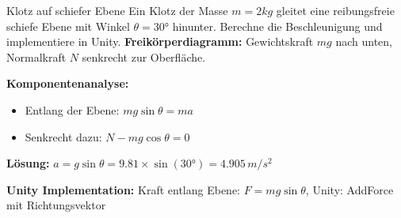 \begin{example2}{Klotz auf schiefer Ebene}
    Ein Klotz der Masse $m = 2kg$ gleitet eine reibungsfreie schiefe Ebene mit Winkel $\theta = 30°$ hinunter. Berechne die Beschleunigung und implementiere in Unity.
    \tcblower
    \textbf{Freikörperdiagramm:} Gewichtskraft $mg$ nach unten, Normalkraft $N$ senkrecht zur Oberfläche.
    
    \textbf{Komponentenanalyse:}
    \begin{itemize}
        \item Entlang der Ebene: $mg\sin\theta = ma$
        \item Senkrecht dazu: $N - mg\cos\theta = 0$
    \end{itemize}
    
    \textbf{Lösung:} $a = g\sin\theta = 9.81 \times \sin(30°) = 4.905 \, m/s^2$
    
    \textbf{Unity Implementation:}
Kraft entlang Ebene: $F = mg\sin\theta$, Unity: AddForce mit Richtungsvektor
\end{example2}